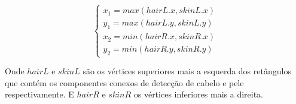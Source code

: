 \documentclass[journal,onecolumn]{IEEEtran}
\begin{document}
	 \begin{equation}
	 	\begin{cases}
	 	x_1 = max(hairL.x,skinL.x) \\
	 	y_1 = max(hairL.y,skinL.y) \\
	 	
	 	x_2 = min(hairR.x,skinR.x) \\
	 	y_2 = min(hairR.y,skinR.y) 
	 	\end{cases}
	 \end{equation}
	 
	Onde $hairL$ e $skinL$ são os vértices superiores mais a esquerda dos retângulos que contém os componentes conexos de detecção de cabelo e pele respectivamente.
	E $hairR$ e $skinR$ os vértices inferiores mais a direita.
	
	


\end{document}
